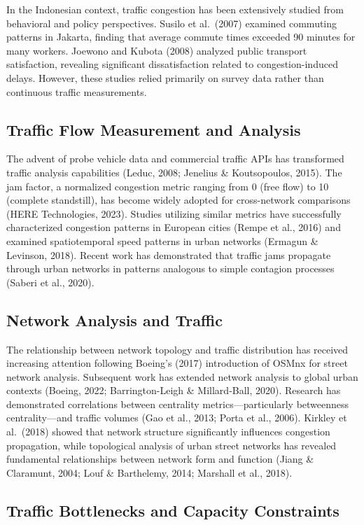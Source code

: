 \documentclass[12pt,a4paper]{article}
\begin{document}
In the Indonesian context, traffic congestion has been extensively studied from behavioral and policy perspectives. Susilo et al.~(2007) examined commuting patterns in Jakarta, finding that average commute times exceeded 90 minutes for many workers. Joewono and Kubota (2008) analyzed public transport satisfaction, revealing significant dissatisfaction related to congestion-induced delays. However, these studies relied primarily on survey data rather than continuous traffic measurements.

\subsection{Traffic Flow Measurement and Analysis}

The advent of probe vehicle data and commercial traffic APIs has transformed traffic analysis capabilities (Leduc, 2008; Jenelius \& Koutsopoulos, 2015). The jam factor, a normalized congestion metric ranging from 0 (free flow) to 10 (complete standstill), has become widely adopted for cross-network comparisons (HERE Technologies, 2023). Studies utilizing similar metrics have successfully characterized congestion patterns in European cities (Rempe et al., 2016) and examined spatiotemporal speed patterns in urban networks (Ermagun \& Levinson, 2018). Recent work has demonstrated that traffic jams propagate through urban networks in patterns analogous to simple contagion processes (Saberi et al., 2020).

\subsection{Network Analysis and Traffic}

The relationship between network topology and traffic distribution has received increasing attention following Boeing's (2017) introduction of OSMnx for street network analysis. Subsequent work has extended network analysis to global urban contexts (Boeing, 2022; Barrington-Leigh \& Millard-Ball, 2020). Research has demonstrated correlations between centrality metrics---particularly betweenness centrality---and traffic volumes (Gao et al., 2013; Porta et al., 2006). Kirkley et al.~(2018) showed that network structure significantly influences congestion propagation, while topological analysis of urban street networks has revealed fundamental relationships between network form and function (Jiang \& Claramunt, 2004; Louf \& Barthelemy, 2014; Marshall et al., 2018).

\subsection{Traffic Bottlenecks and Capacity Constraints}
\end{document}
